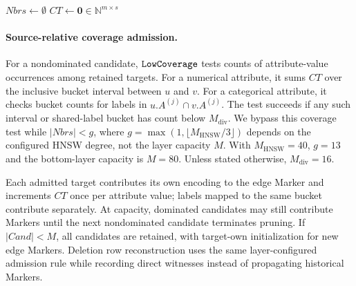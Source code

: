 \begin{algorithm}[t]
\caption{{\tt Full Marker-augmented Pruning}}
\label{alg:complete-pruning}
\small
{}
$Nbrs \gets \emptyset$\;
$CT \gets \mathbf{0} \in \mathbb{N}^{m \times s}$\;
\end{algorithm}

\paragraph{Source-relative coverage admission.}
For a nondominated candidate, ${\tt LowCoverage}$ tests counts of attribute-value occurrences among retained targets.
For a numerical attribute, it sums $CT$ over the inclusive bucket interval between $u$ and $v$.
For a categorical attribute, it checks bucket counts for labels in $u.A^{(j)}\cap v.A^{(j)}$.
The test succeeds if any such interval or shared-label bucket has count below $M_{\mathrm{div}}$.
We bypass this coverage test while $|Nbrs|<g$, where $g=\max(1,\lfloor M_{\mathrm{HNSW}}/3\rfloor)$ depends on the configured HNSW degree, not the layer capacity $M$.
With $M_{\mathrm{HNSW}}=40$, $g=13$ and the bottom-layer capacity is $M=80$.
Unless stated otherwise, $M_{\mathrm{div}}=16$.

Each admitted target contributes its own encoding to the edge Marker and increments $CT$ once per attribute value; labels mapped to the same bucket contribute separately.
At capacity, dominated candidates may still contribute Markers until the next nondominated candidate terminates pruning.
If $|Cand|<M$, all candidates are retained, with target-own initialization for new edge Markers.
Deletion row reconstruction uses the same layer-configured admission rule while recording direct witnesses instead of propagating historical Markers.

